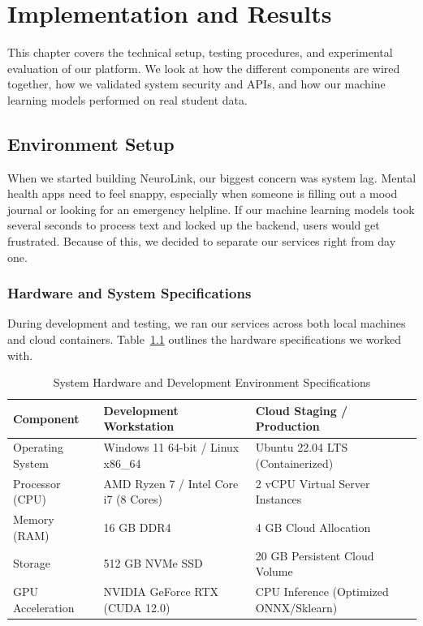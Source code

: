 \chapter{Implementation and Results}

This chapter covers the technical setup, testing procedures, and experimental evaluation of our platform. We look at how the different components are wired together, how we validated system security and APIs, and how our machine learning models performed on real student data.

\section{Environment Setup}
When we started building NeuroLink, our biggest concern was system lag. Mental health apps need to feel snappy, especially when someone is filling out a mood journal or looking for an emergency helpline. If our machine learning models took several seconds to process text and locked up the backend, users would get frustrated. Because of this, we decided to separate our services right from day one.

\subsection{Hardware and System Specifications}
During development and testing, we ran our services across both local machines and cloud containers. Table~\ref{tab:env_hardware} outlines the hardware specifications we worked with.

\begin{table}[H]
\centering
\caption{System Hardware and Development Environment Specifications}
\label{tab:env_hardware}
\begin{tabular}{lll}
\toprule
\textbf{Component} & \textbf{Development Workstation} & \textbf{Cloud Staging / Production} \\
\midrule
Operating System   & Windows 11 64-bit / Linux x86\_64 & Ubuntu 22.04 LTS (Containerized) \\
Processor (CPU)    & AMD Ryzen 7 / Intel Core i7 (8 Cores) & 2 vCPU Virtual Server Instances \\
Memory (RAM)       & 16 GB DDR4                       & 4 GB Cloud Allocation \\
Storage            & 512 GB NVMe SSD                  & 20 GB Persistent Cloud Volume \\
GPU Acceleration   & NVIDIA GeForce RTX (CUDA 12.0)   & CPU Inference (Optimized ONNX/Sklearn) \\
\bottomrule
\end{tabular}
\end{table}

